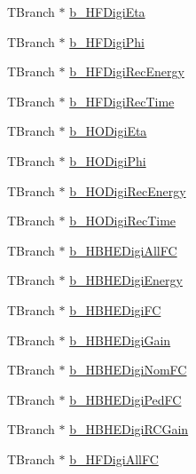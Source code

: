 \begin{DoxyCompactItemize}
\item 
T\+Branch $\ast$ \hyperlink{class_hcal_tuple_tree_af649d3db8a8480c98e9afa39cc67730f}{b\+\_\+\+H\+F\+Digi\+Eta}
\item 
T\+Branch $\ast$ \hyperlink{class_hcal_tuple_tree_ad9ebda7de737b7e813582130ec32ba4e}{b\+\_\+\+H\+F\+Digi\+Phi}
\item 
T\+Branch $\ast$ \hyperlink{class_hcal_tuple_tree_af1721c2512d8f475e07d4840c5554d28}{b\+\_\+\+H\+F\+Digi\+Rec\+Energy}
\item 
T\+Branch $\ast$ \hyperlink{class_hcal_tuple_tree_ab4886846d83acb34994f1c419dda7c55}{b\+\_\+\+H\+F\+Digi\+Rec\+Time}
\item 
T\+Branch $\ast$ \hyperlink{class_hcal_tuple_tree_a9da16ed42e34f42d6348588f32d261c4}{b\+\_\+\+H\+O\+Digi\+Eta}
\item 
T\+Branch $\ast$ \hyperlink{class_hcal_tuple_tree_ab6cf295ce3adf6582d95e87cd3d9dfe7}{b\+\_\+\+H\+O\+Digi\+Phi}
\item 
T\+Branch $\ast$ \hyperlink{class_hcal_tuple_tree_a9c725c8ac0af59bca2f3bf220773a1c9}{b\+\_\+\+H\+O\+Digi\+Rec\+Energy}
\item 
T\+Branch $\ast$ \hyperlink{class_hcal_tuple_tree_aa8d0faf24fba30ed1ac024d899aa2918}{b\+\_\+\+H\+O\+Digi\+Rec\+Time}
\item 
T\+Branch $\ast$ \hyperlink{class_hcal_tuple_tree_ab8a9521710e3615a2eafc9e1963dcfcb}{b\+\_\+\+H\+B\+H\+E\+Digi\+All\+F\+C}
\item 
T\+Branch $\ast$ \hyperlink{class_hcal_tuple_tree_a455a310701b9a32463a6b5f2f11d7b6d}{b\+\_\+\+H\+B\+H\+E\+Digi\+Energy}
\item 
T\+Branch $\ast$ \hyperlink{class_hcal_tuple_tree_a39f4fd8c8aa9a5304f3c485818db210a}{b\+\_\+\+H\+B\+H\+E\+Digi\+F\+C}
\item 
T\+Branch $\ast$ \hyperlink{class_hcal_tuple_tree_a80aa3db0d9955a54ca4714b26de5f7da}{b\+\_\+\+H\+B\+H\+E\+Digi\+Gain}
\item 
T\+Branch $\ast$ \hyperlink{class_hcal_tuple_tree_a878cadb80d849757f61a62701ce85909}{b\+\_\+\+H\+B\+H\+E\+Digi\+Nom\+F\+C}
\item 
T\+Branch $\ast$ \hyperlink{class_hcal_tuple_tree_a29835761f0be9230cc747e0403ab90a4}{b\+\_\+\+H\+B\+H\+E\+Digi\+Ped\+F\+C}
\item 
T\+Branch $\ast$ \hyperlink{class_hcal_tuple_tree_ad2250b5610b205d32db692c9488f703b}{b\+\_\+\+H\+B\+H\+E\+Digi\+R\+C\+Gain}
\item 
T\+Branch $\ast$ \hyperlink{class_hcal_tuple_tree_a1e1405537122f4406f16b500edc7c082}{b\+\_\+\+H\+F\+Digi\+All\+F\+C}

\end{DoxyCompactItemize}
